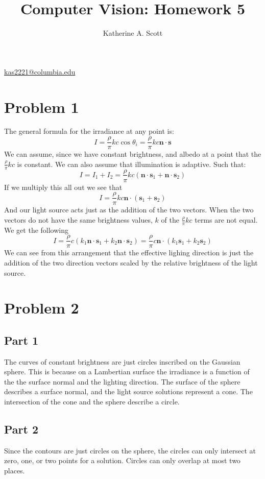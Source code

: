 \documentclass{article}
\begin{document}
\title{Computer Vision: Homework 5}

\author{Katherine A. Scott}
\maketitle
\mbox{}
\begin{center}
\href{mailto:katherineAScott@gmail.com}{kas2221@columbia.edu}

\end{center}
\section{Problem 1}
The general formula for the irradiance at any point is:
\[
I=\frac{\rho}{\pi}kc\cos{\theta_i}=\frac{\rho}{\pi}kc\textbf{n}\cdot\textbf{s}
\]
We can assume, since we have constant brightness, and albedo at a
point that the $\frac{\rho}{\pi}kc$ is constant. We can also assume
that illumination is adaptive. Such that:
\[
I = I_1+I_2 = \frac{\rho}{\pi}kc(\textbf{n} \cdot \textbf{s}_1 + \textbf{n} \cdot
\textbf{s}_2) 
\]
If we multiply this all out we see that 
\[
I = \frac{\rho}{\pi}kc \textbf{n} \cdot (\textbf{s}_1+\textbf{s}_2)
\] 
And our light source acts just as the addition of the two
vectors. When the two vectors do not have the same brightness values,
$k$ of the $\frac{\rho}{\pi}kc$ terms are not equal. We get the
following 
\[
I=\frac{\rho}{\pi}c(k_1\textbf{n} \cdot \textbf{s}_1+
k_2\textbf{n} \cdot \textbf{s}_2)=\frac{\rho}{\pi}c\textbf{n}\cdot(k_1\textbf{s}_1+k_2\textbf{s}_2)
\]
We can see from this arrangement that the effective lighing direction
is just the addition of the two direction vectors scaled by the
relative brightness of the light source. 
\section{Problem 2}
\subsection{Part 1}
The curves of constant brightness are just circles inscribed on the
Gaussian sphere. This is because on a Lambertian surface the
irradiance is a function of the the surface normal and the lighting
direction. The surface of the sphere describes a surface normal, and
the light source solutions represent a cone. The intersection of the
cone and the sphere describe a circle.  
\subsection{Part 2}
Since the contours are just circles on the sphere, the circles can
only intersect at zero, one, or two points for a solution. Circles can only overlap
at most two places. 
\end{document}
